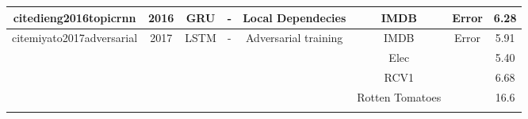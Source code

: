 \documentclass[12pt, a4paper, oneside]{report}
\begin{document}
\begin{tabular}{|c|c|c|c|c|c|cc|}
    cite{dieng2016topicrnn}                             & 2016                  & GRU                               & -                                       & Local Dependecies                                                                                      & IMDB                                  & \multicolumn{1}{c|}{Error}                                                                                                         & 6.28   \\ \hline
    \multirow{5}{*}{cite{miyato2017adversarial}}        & \multirow{5}{*}{2017} & \multirow{5}{*}{LSTM}             & \multirow{5}{*}{-}                      & \multirow{5}{*}{Adversarial training}                                                                  & IMDB                                  & \multicolumn{1}{c|}{\multirow{5}{*}{Error}}                                                                                        & 5.91   \\ \cline{6-6} \cline{8-8} 
                                                                          &                       &                                   &                                         &                                                                                                        & Elec                                  & \multicolumn{1}{c|}{}                                                                                                              & 5.40   \\ \cline{6-6} \cline{8-8} 
                                                                          &                       &                                   &                                         &                                                                                                        & RCV1                                  & \multicolumn{1}{c|}{}                                                                                                              & 6.68   \\ \cline{6-6} \cline{8-8} 
                                                                          &                       &                                   &                                         &                                                                                                        & Rotten Tomatoes                       & \multicolumn{1}{c|}{}                                                                                                              & 16.6   \\ \cline{6-6} \cline{8-8} 

\end{tabular}
\end{document}
